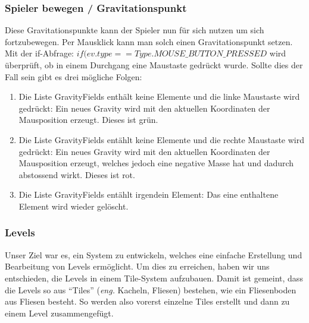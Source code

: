 \documentclass[12pt,a4paper]{scrartcl}
\newcommand{\q}[1]{``#1''}
\begin{document}
\subsubsection{Spieler bewegen / Gravitationspunkt}
Diese Gravitationspunkte kann der Spieler nun für sich nutzen um sich fortzubewegen.
Per Mausklick kann man solch einen Gravitationspunkt setzen.
Mit der if-Abfrage: 
$if(ev.type == Type.MOUSE\_BUTTON\_PRESSED$
wird überprüft, ob in einem Durchgang eine Maustaste gedrückt wurde. Sollte dies der Fall sein gibt es drei mögliche Folgen:
\begin{enumerate}
\item Die Liste GravityFields enthält keine Elemente und die linke Maustaste wird gedrückt: Ein neues Gravity wird mit den aktuellen Koordinaten der Mausposition erzeugt. Dieses ist grün.
\item Die Liste GravityFields entählt keine Elemente und die rechte  Maustaste wird gedrückt: Ein neues Gravity wird mit den aktuellen Koordinaten der Mausposition erzeugt, welches jedoch eine negative Masse hat und dadurch abstossend wirkt. Dieses ist rot.
\item Die Liste GravityFields entählt irgendein Element:
Das eine enthaltene Element wird wieder gelöscht.
\end{enumerate}
\subsubsection{Levels}
Unser Ziel war es, ein System zu entwickeln, welches eine einfache Erstellung und Bearbeitung von Levels ermöglicht. Um dies zu erreichen, haben wir uns entschieden, die Levels in einem Tile-System aufzubauen. Damit ist gemeint, dass die Levels so aus \q{Tiles} (\textit{eng.} Kacheln, Fliesen) bestehen, wie ein Fliesenboden aus Fliesen besteht. So werden also vorerst einzelne Tiles erstellt und dann zu einem Level zusammengefügt.\\
\end{document}
